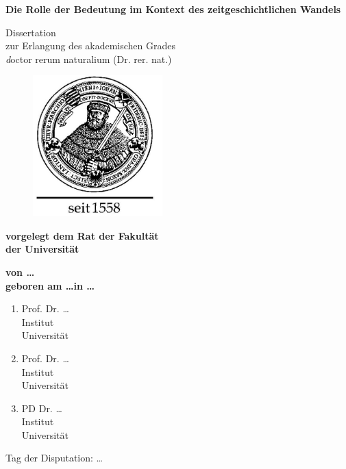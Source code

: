 \begin{titlepage}

\begin{center}
\vspace*{3 cm}
\textsf{\textbf{\huge Die Rolle der Bedeutung im Kontext des zeitgeschichtlichen Wandels}}

\vspace{3 cm}
{\huge Dissertation} \\ {\Large zur Erlangung des akademischen Grades \\ {\textit doctor rerum naturalium} (Dr. rer. nat.)}

\end{center}


\begin{figure}[h!]
    \centering
	\includegraphics[width=5cm]{./logos/Hanfried.jpg}
\end{figure}

\vspace*{\fill}

\noindent
\textbf{vorgelegt dem Rat der Fakultät\\
der Universität}

\vspace{1cm}
\noindent
\textbf{von \ldots\\
geboren am \ldots in \ldots}

\newpage
\thispagestyle{empty}

\vspace*{\fill}

\begin{enumerate}
  \item Prof. Dr. \ldots  \\ 
  Institut\\
  Universität
  \item Prof. Dr. \ldots  \\ 
  Institut\\
  Universität
  \item PD Dr. \ldots  \\ 
  Institut\\
  Universität
\end{enumerate}

Tag der Disputation: \ldots

\newpage
\end{titlepage}
